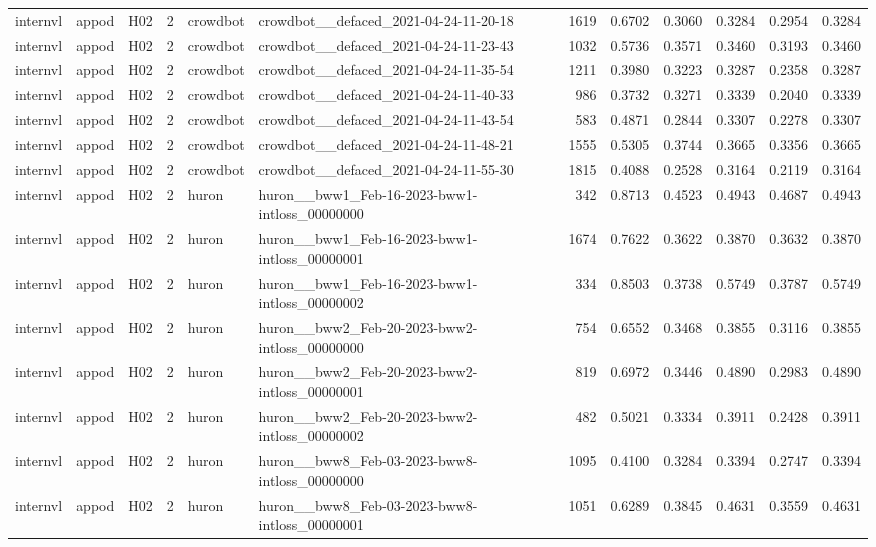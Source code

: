 \begin{table}[tbp]
\begin{tabular}{lllrllrrrrrr}
internvl & appod & H02 & 2 & crowdbot & crowdbot\_\_defaced\_2021-04-24-11-20-18 & 1619 & 0.6702 & 0.3060 & 0.3284 & 0.2954 & 0.3284 \\
internvl & appod & H02 & 2 & crowdbot & crowdbot\_\_defaced\_2021-04-24-11-23-43 & 1032 & 0.5736 & 0.3571 & 0.3460 & 0.3193 & 0.3460 \\
internvl & appod & H02 & 2 & crowdbot & crowdbot\_\_defaced\_2021-04-24-11-35-54 & 1211 & 0.3980 & 0.3223 & 0.3287 & 0.2358 & 0.3287 \\
internvl & appod & H02 & 2 & crowdbot & crowdbot\_\_defaced\_2021-04-24-11-40-33 & 986 & 0.3732 & 0.3271 & 0.3339 & 0.2040 & 0.3339 \\
internvl & appod & H02 & 2 & crowdbot & crowdbot\_\_defaced\_2021-04-24-11-43-54 & 583 & 0.4871 & 0.2844 & 0.3307 & 0.2278 & 0.3307 \\
internvl & appod & H02 & 2 & crowdbot & crowdbot\_\_defaced\_2021-04-24-11-48-21 & 1555 & 0.5305 & 0.3744 & 0.3665 & 0.3356 & 0.3665 \\
internvl & appod & H02 & 2 & crowdbot & crowdbot\_\_defaced\_2021-04-24-11-55-30 & 1815 & 0.4088 & 0.2528 & 0.3164 & 0.2119 & 0.3164 \\
internvl & appod & H02 & 2 & huron & huron\_\_bww1\_Feb-16-2023-bww1-intloss\_00000000 & 342 & 0.8713 & 0.4523 & 0.4943 & 0.4687 & 0.4943 \\
internvl & appod & H02 & 2 & huron & huron\_\_bww1\_Feb-16-2023-bww1-intloss\_00000001 & 1674 & 0.7622 & 0.3622 & 0.3870 & 0.3632 & 0.3870 \\
internvl & appod & H02 & 2 & huron & huron\_\_bww1\_Feb-16-2023-bww1-intloss\_00000002 & 334 & 0.8503 & 0.3738 & 0.5749 & 0.3787 & 0.5749 \\
internvl & appod & H02 & 2 & huron & huron\_\_bww2\_Feb-20-2023-bww2-intloss\_00000000 & 754 & 0.6552 & 0.3468 & 0.3855 & 0.3116 & 0.3855 \\
internvl & appod & H02 & 2 & huron & huron\_\_bww2\_Feb-20-2023-bww2-intloss\_00000001 & 819 & 0.6972 & 0.3446 & 0.4890 & 0.2983 & 0.4890 \\
internvl & appod & H02 & 2 & huron & huron\_\_bww2\_Feb-20-2023-bww2-intloss\_00000002 & 482 & 0.5021 & 0.3334 & 0.3911 & 0.2428 & 0.3911 \\
internvl & appod & H02 & 2 & huron & huron\_\_bww8\_Feb-03-2023-bww8-intloss\_00000000 & 1095 & 0.4100 & 0.3284 & 0.3394 & 0.2747 & 0.3394 \\
internvl & appod & H02 & 2 & huron & huron\_\_bww8\_Feb-03-2023-bww8-intloss\_00000001 & 1051 & 0.6289 & 0.3845 & 0.4631 & 0.3559 & 0.4631 \\

\end{tabular}
\end{table}
